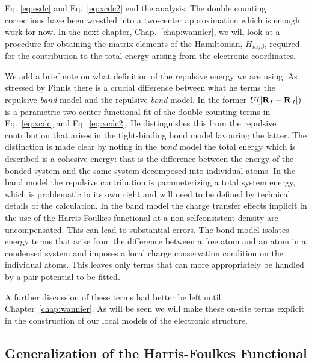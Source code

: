 Eq. \ref{eq:esdc} and Eq.~\ref{eq:xcdc2} end the analysis.
The double counting corrections have been wrestled into a two-center 
approximation which is enough work for now. In the next chapter, Chap.~\ref{chap:wannier},
we will look at a procedure for obtaining the matrix elements of the 
Hamiltonian, $H_{i\alpha j\beta}$, required for the contribution to the total
energy arising from the electronic coordinates.

We add a brief note on what definition of the repulsive energy we are using.
As stressed by Finnis there is a crucial difference between what he terms the
repulsive \textit{band} model and the repulsive \textit{bond} model. 
In the former $U(|{\bf R}_I - {\bf R}_J|)$ is a parametric two-center 
functional fit of the double counting terms in Eq.~\ref{eq:xcdc} and Eq.~\ref{eq:xcdc2}.
He distinguishes this from the repulsive contribution that arises in the tight-binding bond model\cite{sutton88} 
favouring the latter. The distinction is made clear by noting in the \textit{bond} 
model the total energy which is described
is a cohesive energy: that is the difference between the energy of the bonded system
and the same system decomposed into individual atoms. In the band model the repulsive contribution
is parameterizing a total system energy, which is problematic in its own right and
will need to be defined by technical details of the calculation.
In the band model the charge transfer effects implicit in the use of 
the Harris-Foulkes functional at a non-selfconsistent density 
are uncompensated.  This can lead to substantial errors.
The bond model isolates energy terms that arise from the difference between a free atom and an atom
in a condensed system and imposes a local charge conservation condition on the individual atoms.
This leaves only terms that can more appropriately be handled by a pair potential to be fitted.

A further discussion of these terms had better be left until Chapter~\ref{chap:wannier}.
As will be seen we will make these on-site terms explicit in the construction 
of our local models of the electronic structure. 

\subsection{Generalization of the Harris-Foulkes Functional}
%
%

